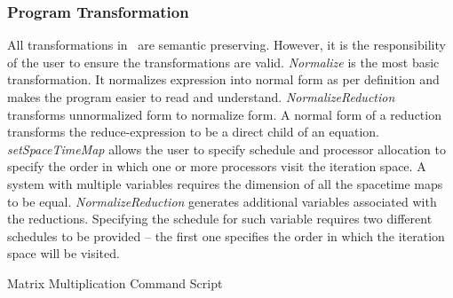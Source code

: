 \subsubsection{Program Transformation}
All transformations in \alphaz\ are semantic preserving. However, it is the responsibility of the user to ensure the transformations are valid. \textit{Normalize} is the most basic transformation. It normalizes expression into normal form as per definition and makes the program easier to read and understand. \textit{NormalizeReduction} transforms unnormalized form to normalize form. A normal form of a reduction transforms the reduce-expression to be a direct child of an equation.  \textit{setSpaceTimeMap} allows the user to specify schedule and processor allocation to specify the order in which one or more processors visit the iteration space. A system with multiple variables requires the dimension of all the spacetime maps to be equal. \textit{NormalizeReduction} generates additional variables associated with the reductions. Specifying the schedule for such variable requires two different schedules to be provided – the first one specifies the order in which the iteration space will be visited.
 \begin{algorithm}
 \caption{Matrix Multiplication Command Script}
 \begin{algorithmic} [1]
 \STATE {}
 \STATE {}
 \STATE {}
 \STATE {}

 \STATE \text{}
 \STATE {}
 \STATE {}
 \STATE {}
 \STATE {}
 \STATE {}
 \STATE {}
 \STATE \text{}
 \STATE {}
 \STATE {}
\STATE {}
\end{algorithmic}
\label{algo:matrix_mul_script}
\end{algorithm}
